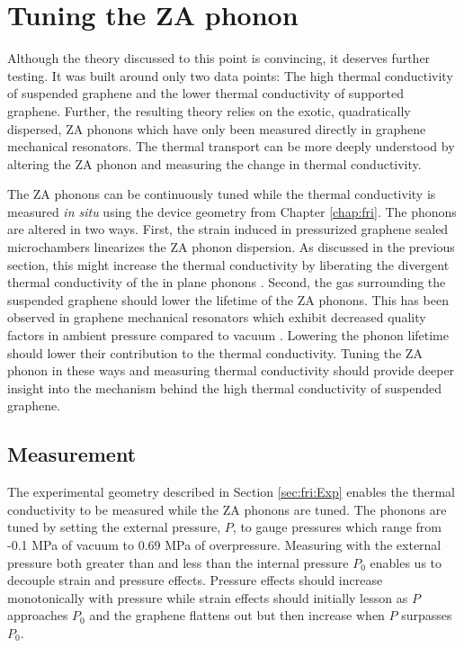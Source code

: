 \section{Tuning the ZA phonon}
Although the theory discussed to this point is convincing, it deserves further testing.
It was built around only two data points: The high thermal conductivity of suspended graphene and the lower thermal conductivity of supported graphene.
Further, the resulting theory relies on the exotic, quadratically dispersed, ZA phonons which have only been measured directly in graphene mechanical resonators.
The thermal transport can be more deeply understood by altering the ZA phonon and measuring the change in thermal conductivity.

The ZA phonons can be continuously tuned while the thermal conductivity is measured \textit{in situ} using the device geometry from Chapter \ref{chap:fri}.
The phonons are altered in two ways.
First, the strain induced in pressurized graphene sealed microchambers linearizes the ZA phonon dispersion.
As discussed in the previous section, this might increase the thermal conductivity by liberating the divergent thermal conductivity of the in plane phonons \cite{Pereira2013,Bonini2012}.
Second, the gas surrounding the suspended graphene should lower the lifetime of the ZA phonons.
This has been observed in graphene mechanical resonators which exhibit decreased quality factors in ambient pressure compared to vacuum \cite{Bunch2007}.
Lowering the phonon lifetime should lower their contribution to the thermal conductivity.
Tuning the ZA phonon in these ways and measuring thermal conductivity should provide deeper insight into the mechanism behind the high thermal conductivity of suspended graphene.

\subsection{Measurement}
The experimental geometry described in Section \ref{sec:fri:Exp} enables the thermal conductivity to be measured while the ZA phonons are tuned.
The phonons are tuned by setting the external pressure, $P$, to gauge pressures which range from -0.1 MPa of vacuum to 0.69 MPa of overpressure.
Measuring with the external pressure both greater than and less than the internal pressure $P_0$ enables us to decouple strain and pressure effects.
Pressure effects should increase monotonically with pressure while strain effects should initially lesson as $P$ approaches $P_0$ and the graphene flattens out but then increase when $P$ surpasses $P_0$.

